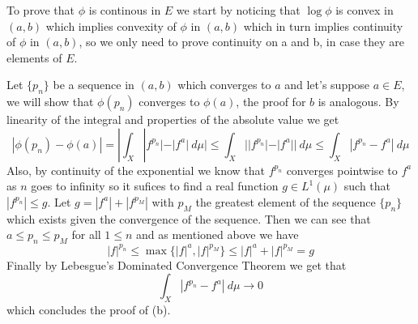 \documentclass{article}
\begin{document}
\begin{exercise}
\bigbreak

    To prove that $\phi$ is continous in $E$ we start by noticing that $\log \phi$ is convex in $ \left( a,b \right) $ which implies convexity of $\phi$ in $ \left( a,b \right) $ which in turn implies continuity of $\phi$ in $ \left( a,b \right) $, so we only need to prove continuity on a and b, in case they are elements of $E$.

    Let $\{p_n\}$ be a sequence in $ \left( a,b \right) $ which converges to $a$ and let's suppose $a \in E$, we will show that $\phi \left( p_n \right) $ converges to $\phi \left( a \right) $, the proof for $b$ is analogous. By linearity of the integral and properties of the absolute value we get
    \[
        |\phi \left( p_n \right) - \phi \left( a \right) | = | \int_X |f^{p_n}| - |f^a|\: d\mu | \le \int_X ||f^{p_n}|-|f^a||\: d\mu \le \int_X |f^{p_n} - f^a|\: d\mu 
    \]
    Also, by continuity of the exponential we know that $f^{p_n}$ converges pointwise to $f^a$ as $n$ goes to infinity so it sufices to find a real function $g \in L^1 \left( \mu \right) $ such that $|f^{p_n}| \le g$. Let $g=|f^a|+|f^{p_M}|$ with $p_M$ the greatest element of the sequence $\{p_n\}$ which exists given the convergence of the sequence. Then we can see that $a \le p_n \le p_M$ for all $1 \le n$ and as mentioned above we have
    \[
        |f|^{p_n} \le \max \{ |f|^a , |f|^{p_M}\} \le |f|^a + |f|^{p_M} = g
    \]
    Finally by Lebesgue's Dominated Convergence Theorem we get that
    \[
        \int_X |f^{p_n} - f^a|\: d\mu \rightarrow 0   
    \]
    which concludes the proof of (b).

\bigbreak


\end{exercise}

\bigbreak
\end{document}

